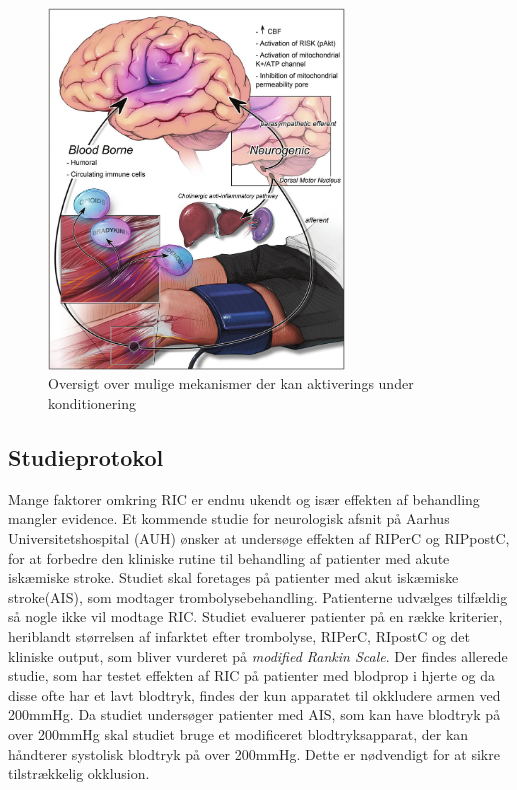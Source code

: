 \begin{figure}[H]
	\centering
	\includegraphics[width = 0.7\textwidth]{billeder/Konditioneringsmekanismer.png}
	\caption{Oversigt over mulige mekanismer der kan aktiverings under konditionering} \label{fig:mechanism}
\end{figure}

\subsection{Studieprotokol}

Mange faktorer omkring RIC er endnu ukendt og især effekten af behandling mangler evidence. Et kommende studie for neurologisk afsnit på Aarhus Universitetshospital (AUH) ønsker at undersøge effekten af RIPerC og RIPpostC, for at forbedre den kliniske rutine til behandling af patienter med akute iskæmiske stroke.  Studiet skal foretages på patienter med akut iskæmiske stroke(AIS), som modtager trombolysebehandling. Patienterne udvælges tilfældig så nogle ikke vil modtage RIC. Studiet evaluerer patienter på en række kriterier, heriblandt størrelsen af infarktet efter trombolyse, RIPerC, RIpostC og det kliniske output, som bliver vurderet på \textit{modified Rankin Scale}. Der findes allerede studie, som har testet effekten af RIC på patienter med blodprop i hjerte og da disse ofte har et lavt blodtryk, findes der kun apparatet til okkludere armen ved 200mmHg. Da studiet undersøger patienter med AIS, som kan have blodtryk på over 200mmHg skal studiet bruge et modificeret blodtryksapparat, der kan håndterer systolisk blodtryk på over 200mmHg. Dette er nødvendigt for at sikre tilstrækkelig okklusion.

